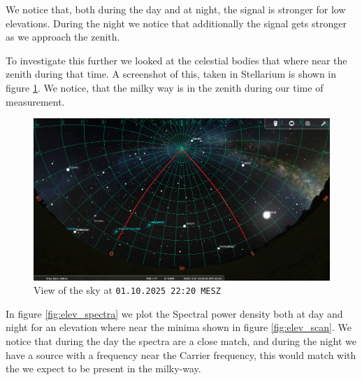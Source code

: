 We notice that, both during the day and at night, the signal is stronger for low elevations. During the night we notice that additionally the signal gets stronger as we approach the zenith.

To investigate this further we looked at the celestial bodies that where near the zenith during that time. A screenshot of this, taken in Stellarium is shown in figure \ref{fig:stellarium}. We notice, that the milky way is in the zenith during our time of measurement.

\begin{figure}[H]
    \centering
    \includegraphics[width=0.6\linewidth]{assets/ElevationScan_Az90_Az180_251001_2220MESZ.png}
    \caption{View of the sky at \texttt{01.10.2025 22:20 MESZ}}
    \label{fig:stellarium}
\end{figure}

In figure \ref{fig:elev_spectra} we plot the Spectral power density both at day and night for an elevation where near the minima shown in figure \ref{fig:elev_scan}. We notice that during the day the spectra are a close match, and during the night we have a source with a frequency near the Carrier frequency, this would match with the  we expect to be present in the milky-way.

